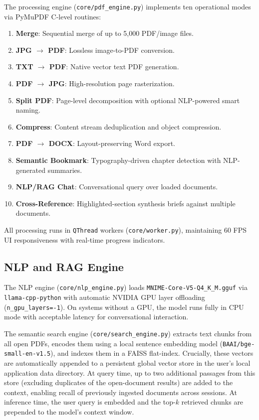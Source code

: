 \documentclass[11pt]{article}
\begin{document}
The processing engine (\texttt{core/pdf\_engine.py}) implements ten
operational modes via PyMuPDF C-level routines:

\begin{enumerate}
    \item \textbf{Merge}: Sequential merge of up to 5,000 PDF/image files.
    \item \textbf{JPG $\rightarrow$ PDF}: Lossless image-to-PDF conversion.
    \item \textbf{TXT $\rightarrow$ PDF}: Native vector text PDF generation.
    \item \textbf{PDF $\rightarrow$ JPG}: High-resolution page rasterization.
    \item \textbf{Split PDF}: Page-level decomposition with optional NLP-powered smart naming.
    \item \textbf{Compress}: Content stream deduplication and object compression.
    \item \textbf{PDF $\rightarrow$ DOCX}: Layout-preserving Word export.
    \item \textbf{Semantic Bookmark}: Typography-driven chapter detection with NLP-generated summaries.
    \item \textbf{NLP/RAG Chat}: Conversational query over loaded documents.
    \item \textbf{Cross-Reference}: Highlighted-section synthesis briefs against multiple documents.
\end{enumerate}

All processing runs in \texttt{QThread} workers (\texttt{core/worker.py}),
maintaining 60 FPS UI responsiveness with real-time progress indicators.

\subsection{NLP and RAG Engine}

The NLP engine (\texttt{core/nlp\_engine.py}) loads
\texttt{MNIME-Core-V5-Q4\_K\_M.gguf} via \texttt{llama-cpp-python}
with automatic NVIDIA GPU layer offloading (\texttt{n\_gpu\_layers=-1}).
On systems without a GPU, the model runs fully in CPU mode with
acceptable latency for conversational interaction.

The semantic search engine (\texttt{core/search\_engine.py}) extracts
text chunks from all open PDFs, encodes them using a local sentence embedding
model (\texttt{BAAI/bge-small-en-v1.5}), and indexes them in a FAISS flat-index.
Crucially, these vectors are automatically appended to a persistent global vector store 
in the user's local application data directory. At query time, up to two additional passages 
from this store (excluding duplicates of the open-document results) are added to the context, 
enabling recall of previously ingested documents across sessions.
At inference time, the user query is embedded and the top-$k$ retrieved
chunks are prepended to the model's context window.
\end{document}
